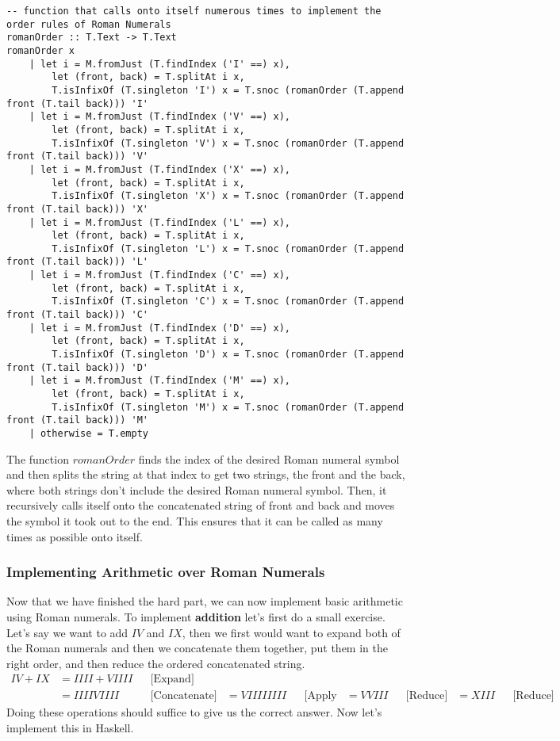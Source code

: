 \documentclass{article}
\begin{document}
\begin{lstlisting}
-- function that calls onto itself numerous times to implement the order rules of Roman Numerals 
romanOrder :: T.Text -> T.Text
romanOrder x
    | let i = M.fromJust (T.findIndex ('I' ==) x),
        let (front, back) = T.splitAt i x,
        T.isInfixOf (T.singleton 'I') x = T.snoc (romanOrder (T.append front (T.tail back))) 'I'
    | let i = M.fromJust (T.findIndex ('V' ==) x), 
        let (front, back) = T.splitAt i x, 
        T.isInfixOf (T.singleton 'V') x = T.snoc (romanOrder (T.append front (T.tail back))) 'V'
    | let i = M.fromJust (T.findIndex ('X' ==) x), 
        let (front, back) = T.splitAt i x, 
        T.isInfixOf (T.singleton 'X') x = T.snoc (romanOrder (T.append front (T.tail back))) 'X'
    | let i = M.fromJust (T.findIndex ('L' ==) x), 
        let (front, back) = T.splitAt i x, 
        T.isInfixOf (T.singleton 'L') x = T.snoc (romanOrder (T.append front (T.tail back))) 'L'
    | let i = M.fromJust (T.findIndex ('C' ==) x), 
        let (front, back) = T.splitAt i x, 
        T.isInfixOf (T.singleton 'C') x = T.snoc (romanOrder (T.append front (T.tail back))) 'C'
    | let i = M.fromJust (T.findIndex ('D' ==) x), 
        let (front, back) = T.splitAt i x, 
        T.isInfixOf (T.singleton 'D') x = T.snoc (romanOrder (T.append front (T.tail back))) 'D'
    | let i = M.fromJust (T.findIndex ('M' ==) x), 
        let (front, back) = T.splitAt i x, 
        T.isInfixOf (T.singleton 'M') x = T.snoc (romanOrder (T.append front (T.tail back))) 'M'
    | otherwise = T.empty
\end{lstlisting}
The function $romanOrder$ finds the index of the desired Roman numeral symbol and then splits the string at that index to get two strings, the front and the back, where both strings don't include the desired Roman numeral symbol. Then, it recursively calls itself onto the concatenated string of front and back and moves the symbol it took out to the end. This ensures that it can be called as many times as possible onto itself.

\subsubsection{Implementing Arithmetic over Roman Numerals}
Now that we have finished the hard part, we can now implement basic arithmetic using Roman numerals. To implement \textbf{addition} let's first do a small exercise. Let's say we want to add $IV$ and $IX$, then we first would want to expand both of the Roman numerals and then we concatenate them together, put them in the right order, and then reduce the ordered concatenated string.
\begin{align*}
    IV + IX &= IIII + VIIII &&\text{[Expand]}\\
    &= IIIIVIIII &&\text{[Concatenate]}
    &= VIIIIIIII &&\text{[Apply Order]}
    &= VVIII &&\text{[Reduce]}
    &= XIII &&\text{[Reduce]}
\end{align*}
Doing these operations should suffice to give us the correct answer. Now let's implement this in Haskell.
\end{document}
